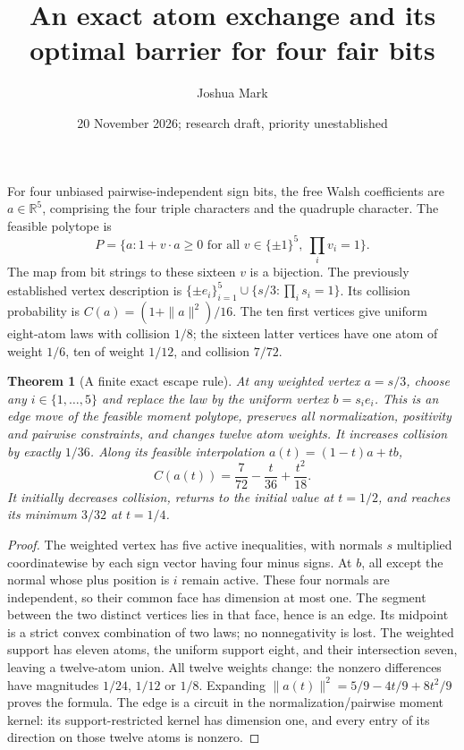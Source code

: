 \documentclass[11pt]{article}
\title{An exact atom exchange and its optimal barrier for four fair bits}
\author{Joshua Mark}
\date{20 November 2026; research draft, priority unestablished}
\newtheorem{theorem}{Theorem}
\begin{document}
\maketitle
For four unbiased pairwise-independent sign bits, the free Walsh
coefficients are $a\in\mathbb R^5$, comprising the four triple
characters and the quadruple character. The feasible polytope is
\[
 P=\{a:1+v\cdot a\ge0\text{ for all }v\in\{\pm1\}^5,
 \ \prod_i v_i=1\}.
\]
The map from bit strings to these sixteen $v$ is a bijection.
The previously established vertex description is
$\{\pm e_i\}_{i=1}^5\cup\{s/3:\prod_i s_i=1\}$.
Its collision probability is $C(a)=(1+\|a\|^2)/16$.
The ten first vertices give uniform eight-atom laws with collision
$1/8$; the sixteen latter vertices have one atom of weight $1/6$,
ten of weight $1/12$, and collision $7/72$.

\begin{theorem}[A finite exact escape rule]
At any weighted vertex $a=s/3$, choose any $i\in\{1,\ldots,5\}$
and replace the law by the uniform vertex $b=s_i e_i$.
This is an edge move of the feasible moment polytope, preserves all
normalization, positivity and pairwise constraints, and changes
twelve atom weights. It increases collision by exactly $1/36$.
Along its feasible interpolation $a(t)=(1-t)a+tb$,
\[
 C(a(t))=\frac7{72}-\frac{t}{36}+\frac{t^2}{18}.
\]
It initially decreases collision, returns to the initial value at
$t=1/2$, and reaches its minimum $3/32$ at $t=1/4$.
\end{theorem}
\begin{proof}
The weighted vertex has five active inequalities, with normals
$s$ multiplied coordinatewise by each sign vector having four minus
signs. At $b$, all except the normal whose plus position is $i$
remain active. These four normals are independent, so their common
face has dimension at most one. The segment between the two distinct
vertices lies in that face, hence is an edge. Its midpoint is a
strict convex combination of two laws; no nonnegativity is lost.
The weighted support has eleven atoms, the uniform support eight,
and their intersection seven, leaving a twelve-atom union.
All twelve weights change: the nonzero differences have magnitudes
$1/24$, $1/12$ or $1/8$. Expanding
$\|a(t)\|^2=5/9-4t/9+8t^2/9$ proves the formula.
The edge is a circuit in the normalization/pairwise moment kernel:
its support-restricted kernel has dimension one, and every entry of
its direction on those twelve atoms is nonzero.
\end{proof}
\end{document}
